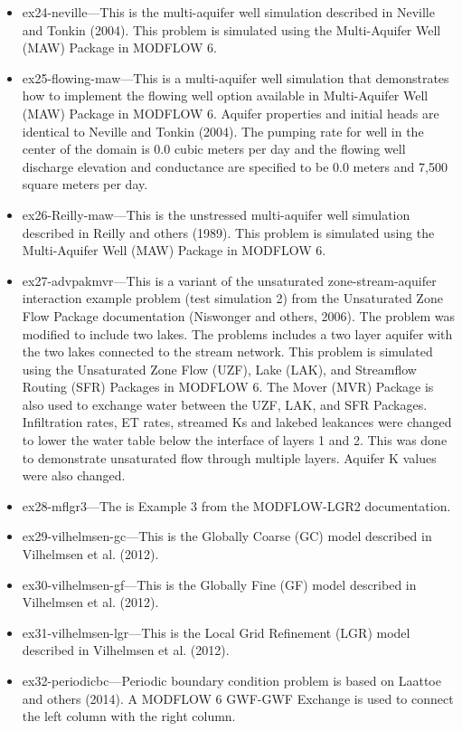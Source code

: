 \begin{itemize}
\item ex24-neville---This is the multi-aquifer well simulation described in Neville and Tonkin (2004).  This problem is simulated using the Multi-Aquifer Well (MAW) Package in MODFLOW 6.
\item ex25-flowing-maw---This is a multi-aquifer well simulation that demonstrates how to implement the flowing well option available in Multi-Aquifer Well (MAW) Package in MODFLOW 6. Aquifer properties and initial heads are identical to Neville and Tonkin (2004).  The pumping rate for well in the center of the domain is 0.0 cubic meters per day and the flowing well discharge elevation and conductance are specified to be 0.0 meters and 7,500 square meters per day.
\item ex26-Reilly-maw---This is the unstressed multi-aquifer well simulation described in Reilly and others (1989).  This problem is simulated using the Multi-Aquifer Well (MAW) Package in MODFLOW 6.
\item ex27-advpakmvr---This is a variant of the unsaturated zone-stream-aquifer interaction example problem (test simulation 2) from the Unsaturated Zone Flow Package documentation (Niswonger and others, 2006).  The problem was modified to include two lakes.  The problems includes a two layer aquifer with the two lakes connected to the stream network.  This problem is simulated using the Unsaturated Zone Flow (UZF), Lake (LAK), and Streamflow Routing (SFR) Packages in MODFLOW 6. The Mover (MVR) Package is also used to exchange water between the UZF, LAK, and SFR Packages. Infiltration rates, ET rates, streamed Ks and lakebed leakances were changed to lower the water table below the interface of layers 1 and 2. This was done to demonstrate unsaturated flow through multiple layers. Aquifer K values were also changed.
\item ex28-mflgr3---The is Example 3 from the MODFLOW-LGR2 documentation.
\item ex29-vilhelmsen-gc---This is the Globally Coarse (GC) model described in Vilhelmsen et al. (2012).
\item ex30-vilhelmsen-gf---This is the Globally Fine (GF) model described in Vilhelmsen et al. (2012).
\item ex31-vilhelmsen-lgr---This is the Local Grid Refinement (LGR) model described in Vilhelmsen et al. (2012).
\item ex32-periodicbc---Periodic boundary condition problem is based on Laattoe and others (2014). A MODFLOW 6 GWF-GWF Exchange is used to connect the left column with the right column. 
\end{itemize}
